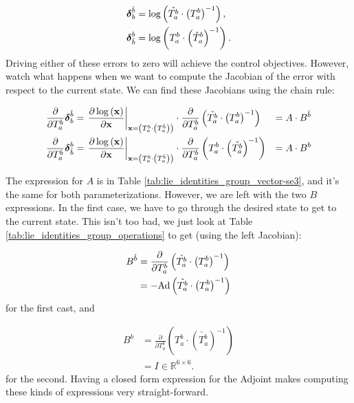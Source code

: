 \begin{align*}
\boldsymbol{\delta}_{b}^{\check{b}} & =\log\left(\check{T_{a}^{b}}\cdot\left(T_{a}^{b}\right)^{-1}\right),\\
\boldsymbol{\delta}_{\check{b}}^{b} & =\log\left(T_{a}^{b}\cdot\left(\check{T}_{a}^{b}\right)^{-1}\right).
\end{align*}
Driving either of these errors to zero will achieve the control objectives.
However, watch what happens when we want to compute the Jacobian of
the error with respect to the current state. We can find these Jacobians
using the chain rule: 

\begin{align*}
\frac{\partial}{\partial T_{a}^{b}}\boldsymbol{\delta}_{b}^{\check{b}} & =\left.\frac{\partial\log\left(\mathbf{x}\right)}{\partial\mathbf{x}}\right|_{\mathbf{x}=\left(T_{a}^{b}\cdot\left(T_{a}^{\check{b}}\right)\right)}\cdot\frac{\partial}{\partial T_{a}^{b}}\left(\check{T_{a}^{b}}\cdot\left(T_{a}^{b}\right)^{-1}\right) & =A\cdot B^{\check{b}}\\
\frac{\partial}{\partial T_{a}^{b}}\boldsymbol{\delta}_{\check{b}}^{b} & =\left.\frac{\partial\log\left(\mathbf{x}\right)}{\partial\mathbf{x}}\right|_{\mathbf{x}=\left(T_{a}^{b}\cdot\left(T_{a}^{\check{b}}\right)\right)}\cdot\frac{\partial}{\partial T_{a}^{b}}\left(T_{a}^{b}\cdot\left(\check{T_{a}^{b}}\right)^{-1}\right) & =A\cdot B^{b}
\end{align*}

The expression for $A$ is in Table \ref{tab:lie_identities_group_vector-se3},
and it's the same for both parameterizations. However, we are left
with the two $B$ expressions. In the first case, we have to go through
the desired state to get to the current state. This isn't too bad,
we just look at Table \ref{tab:lie_identities_group_operations} to
get (using the left Jacobian):

\begin{align*}
B^{\check{b}} & =\frac{\partial}{\partial T_{a}^{b}}\left(\check{T_{a}^{b}}\cdot\left(T_{a}^{b}\right)^{-1}\right)\\
 & =-\textnormal{Ad}\left(\check{T_{a}^{b}}\cdot\left(T_{a}^{b}\right)^{-1}\right)
\end{align*}
for the first cast, and

\begin{align*}
B^{b} & =\frac{\partial}{\partial T_{a}^{b}}\left(T_{a}^{b}\cdot\left(\check{T_{a}^{b}}\right)^{-1}\right)\\
 & =I\in\mathbb{R}^{6\times6}.
\end{align*}
for the second. Having a closed form expression for the Adjoint makes
computing these kinds of expressions very straight-forward. 

